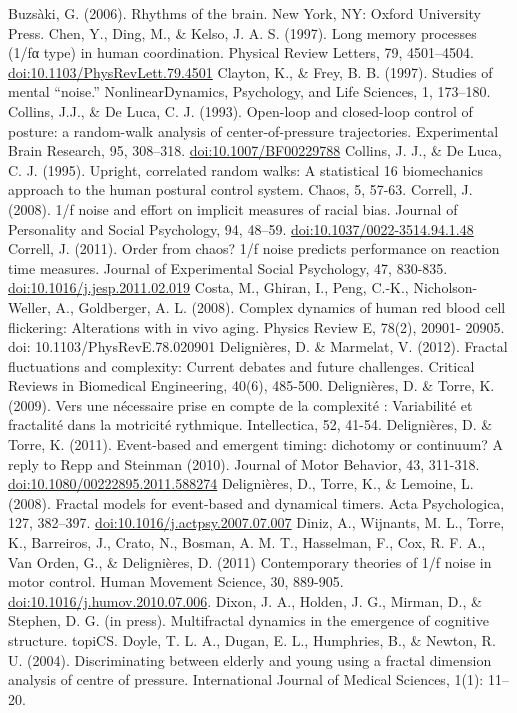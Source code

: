 \documentclass[12pt,]{book}
\begin{document}
Buzsàki, G. (2006). Rhythms of the brain. New York, NY: Oxford University Press.
Chen, Y., Ding, M., \& Kelso, J. A. S. (1997). Long memory processes (1/fα type) in human coordination. Physical Review Letters, 79, 4501--4504. \url{doi:10.1103/PhysRevLett.79.4501}
Clayton, K., \& Frey, B. B. (1997). Studies of mental ``noise.'' NonlinearDynamics, Psychology, and Life Sciences, 1, 173--180.
Collins, J.J., \& De Luca, C. J. (1993). Open-loop and closed-loop control of posture: a random-walk analysis of center-of-pressure trajectories. Experimental Brain Research, 95, 308--318. \url{doi:10.1007/BF00229788}
Collins, J. J., \& De Luca, C. J. (1995). Upright, correlated random walks: A statistical 16 biomechanics approach to the human postural control system. Chaos, 5, 57-63.
Correll, J. (2008). 1/f noise and effort on implicit measures of racial bias. Journal of Personality and Social Psychology, 94, 48--59. \url{doi:10.1037/0022-3514.94.1.48}
Correll, J. (2011). Order from chaos? 1/f noise predicts performance on reaction time measures. Journal of Experimental Social Psychology, 47, 830-835. \url{doi:10.1016/j.jesp.2011.02.019}
Costa, M., Ghiran, I., Peng, C.-K., Nicholson-Weller, A., Goldberger, A. L. (2008). Complex dynamics of human red blood cell flickering: Alterations with in vivo aging. Physics Review E, 78(2), 20901- 20905. doi: 10.1103/PhysRevE.78.020901
Delignières, D. \& Marmelat, V. (2012). Fractal fluctuations and complexity: Current debates and future challenges. Critical Reviews in Biomedical Engineering, 40(6), 485-500.
Delignières, D. \& Torre, K. (2009). Vers une nécessaire prise en compte de la complexité : Variabilité et fractalité dans la motricité rythmique. Intellectica, 52, 41-54.
Delignières, D. \& Torre, K. (2011). Event-based and emergent timing: dichotomy or continuum? A reply to Repp and Steinman (2010). Journal of Motor Behavior, 43, 311-318. \url{doi:10.1080/00222895.2011.588274}
Delignières, D., Torre, K., \& Lemoine, L. (2008). Fractal models for event-based and dynamical timers. Acta Psychologica, 127, 382--397. \url{doi:10.1016/j.actpsy.2007.07.007}
Diniz, A., Wijnants, M. L., Torre, K., Barreiros, J., Crato, N., Bosman, A. M. T., Hasselman, F., Cox, R. F. A., Van Orden, G., \& Delignières, D. (2011) Contemporary theories of 1/f noise in motor control. Human Movement Science, 30, 889-905. \url{doi:10.1016/j.humov.2010.07.006}.
Dixon, J. A., Holden, J. G., Mirman, D., \& Stephen, D. G. (in press). Multifractal dynamics in the emergence of cognitive structure. topiCS.
Doyle, T. L. A., Dugan, E. L., Humphries, B., \& Newton, R. U. (2004). Discriminating between elderly and young using a fractal dimension analysis of centre of pressure. International Journal of Medical Sciences, 1(1): 11--20.
\end{document}
